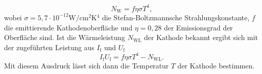 \begin{equation*}
    N_\text{W} = f \eta \sigma T^4,
\end{equation*}
wobei $\sigma = 5,7 \cdot 10^{-12} \si{\watt\per\centi\metre\squared\kelvin^4}$ die Stefan-Boltzmannsche Strahlungskonstante, $f$ die emittierende Kathodenoberfläche und $\eta = 0,28$ der
Emissionsgrad der Oberfläche sind. Ist die Wärmeleistung $N_\text{WL}$ der Kathode bekannt ergibt sich mit der zugeführten Leistung aus $I_\text{f}$ und $U_\text{f}$
\begin{equation}
    I_\text{f} U_\text{f} = f \eta \sigma T^4 - N_\text{WL}.
    \label{eqn:Leistung}
\end{equation}
Mit diesem Ausdruck lässt sich dann die Temperatur $T$ der Kathode bestimmen.
\cite{Anleitung504}
